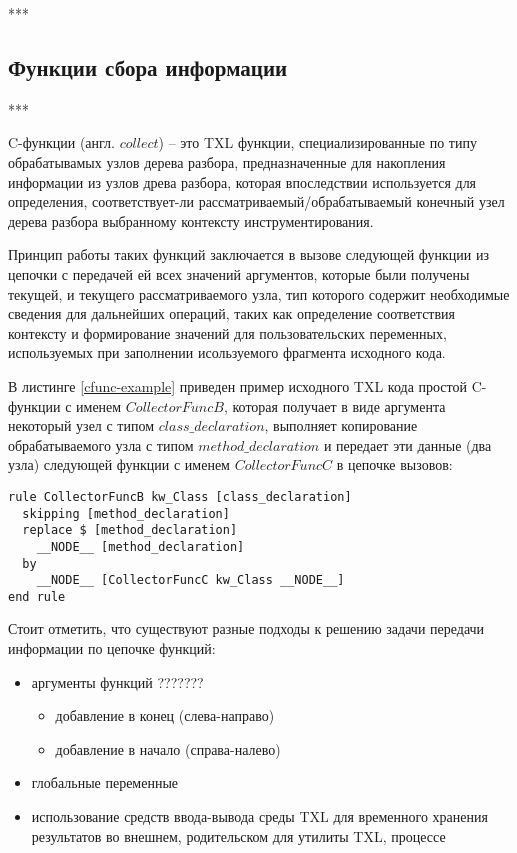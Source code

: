 ***

\subsection{Функции сбора информации}

***

C-функции (англ. $collect$) -- это TXL функции, специализированные по типу обрабатывамых узлов дерева разбора, предназначенные для накопления информации из узлов древа разбора, которая впоследствии используется для определения, соответствует-ли рассматриваемый/обрабатываемый конечный узел дерева разбора выбранному контексту инструментирования.

Принцип работы таких функций заключается в вызове следующей функции из цепочки с передачей ей всех значений аргументов, которые были получены текущей, и текущего рассматриваемого узла, тип которого содержит необходимые сведения для дальнейших операций, таких как определение соответствия контексту и формирование значений для пользовательских переменных, используемых при заполнении исользуемого фрагмента исходного кода.

В листинге \ref{cfunc-example} приведен пример исходного TXL кода простой C-функции с именем $CollectorFuncB$, которая получает в виде аргумента некоторый узел с типом $class\_declaration$, выполняет копирование обрабатываемого узла с типом $method\_declaration$ и передает эти данные (два узла) следующей функции с именем $CollectorFuncC$ в цепочке вызовов:

\begin{lstlisting}[frame=single, language=TXL, label={cfunc-example}, caption={Пример C-функции}]
rule CollectorFuncB kw_Class [class_declaration]
  skipping [method_declaration]
  replace $ [method_declaration]
    __NODE__ [method_declaration]
  by
    __NODE__ [CollectorFuncC kw_Class __NODE__]
end rule
\end{lstlisting}

Стоит отметить, что существуют разные подходы к решению задачи передачи информации по цепочке функций:
\begin {itemize}
  \item аргументы функций ???????
    \begin{itemize}
      \item добавление в конец (слева-направо)
      \item добавление в начало (справа-налево)
    \end{itemize}
  \item глобальные переменные
  \item использование средств ввода-вывода среды TXL для временного хранения результатов во внешнем, родительском для утилиты TXL, процессе
\end{itemize}

